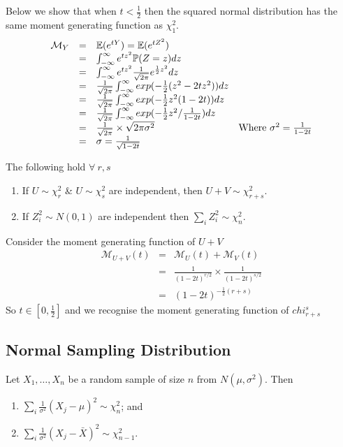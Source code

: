 \documentclass[11pt,a4paper]{article}
\begin{document}
Below we show that when $t<\frac{1}{2}$ then the squared normal distribution has the same moment generating function as $\chi^2_1$.
\[\begin{array}{rcll}
\mathcal{M}_Y&=&\expect(e^{tY})=\expect(e^{tZ^2})\\
&=&\int_{-\infty}^\infty e^{tz^2}\prob(Z=z)dz\\
&=&\int_{-\infty}^\infty e^{tz^2}\frac{1}{\sqrt{2\pi}}e^{\frac{1}{2}z^2}dz\\
&=&\frac{1}{\sqrt{2\pi}}\int_{-\infty}^\infty exp(-\frac{1}{2}(z^2-2tz^2))dz\\
&=&\frac{1}{\sqrt{2\pi}}\int_{-\infty}^\infty exp(-\frac{1}{2}z^2(1-2t))dz\\
&=&\frac{1}{\sqrt{2\pi}}\int_{-\infty}^\infty exp(-\frac{1}{2}z^2/\frac{1}{1-2t})dz\\
&=&\frac{1}{\sqrt{2\pi}}\times\sqrt{2\pi\sigma^2}&\mathrm{Where}\ \sigma^2=\frac{1}{1-2t}\\
&=&\sigma=\frac{1}{\sqrt{1-2t}}
\end{array}\]

The following hold $\forall\ r,s$
\begin{enumerate}[label=\roman*)]
	\item If $U\sim\chi^2_r$ \&  $U\sim\chi^2_s$ are independent, then  $U+V\sim\chi^2_{r+s}$.
	\item If $Z_i^2\sim N(0,1)$ are independent then $\sum_i Z_i^2\sim\chi^2_n$.
\end{enumerate}

Consider the moment generating function of $U+V$
\[\begin{array}{rcl}
\mathcal{M}_{U+V}(t)&=&\mathcal{M}_U(t)+\mathcal{M}_V(t)\\
&=&\frac{1}{(1-2t)^{r/2}}\times\frac{1}{(1-2t)^{s/2}}\\
&=&(1-2t)^{-\frac{1}{2}(r+s)}
\end{array}\]
So $t\in[0,\frac{1}{2}]$ and we recognise the moment generating function of $chi^s_{r+s}$

\subsection{Normal Sampling Distribution}

\theorem{}
Let $X_1,\dots,X_n$ be a random sample of size $n$ from $N(\mu,\sigma^2)$. Then
\begin{enumerate}[label=\roman*)]
	\item $\sum_i\frac{1}{\sigma^2}(X_j-\mu)^2\sim\chi_n^2$; and
	\item $\sum_i\frac{1}{\sigma^2}(X_j-\bar{X})^2\sim\chi_{n-1}^2$.
\end{enumerate}
\end{document}
